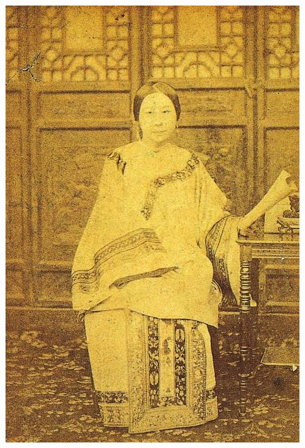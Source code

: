 \begin{figure}[htb]
    \centering %
    \includegraphics[scale=0.3]{picture/对照记23_1.jpeg}

\end{figure}
